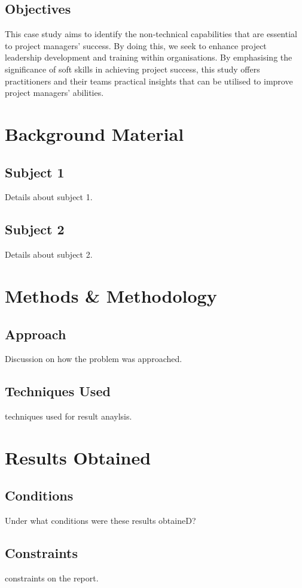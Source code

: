 \documentclass{article}
\begin{document}
\subsection{Objectives}
This case study aims to identify the non-technical capabilities that are essential to project managers' success. By doing this, we seek to enhance project leadership development and training within organisations. By emphasising the significance of soft skills in achieving project success, this study offers practitioners and their teams practical insights that can be utilised to improve project managers' abilities.
\section{Background Material}
\subsection{Subject 1}
Details about subject 1.

\subsection{Subject 2}
Details about subject 2.


\section{Methods \& Methodology}
\subsection{Approach}
Discussion on how the problem was approached.

\subsection{Techniques Used}
techniques used for result anaylsis.

\section{Results Obtained}
\subsection{Conditions}
Under what conditions were these results obtaineD?

\subsection{Constraints}
constraints on the report.
\end{document}
